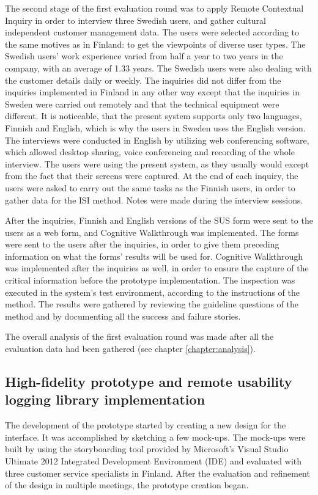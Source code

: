 \documentclass[12pt,a4paper,oneside,pdftex]{report}
\begin{document}
The second stage of the first evaluation round was to apply Remote Contextual Inquiry in order to interview three Swedish users, and gather cultural independent customer management data. The users were selected according to the same motives as in Finland: to get the viewpoints of diverse user types. The Swedish users' work experience varied from half a year to two years in the company, with an average of 1.33 years. The Swedish users were also dealing with the customer details daily or weekly. The inquiries did not differ from the inquiries implemented in Finland in any other way except that the inquiries in Sweden were carried out remotely and that the technical equipment were different. It is noticeable, that the present system supports only two languages, Finnish and English, which is why the users in Sweden uses the English version. The interviews were conducted in English by utilizing web conferencing software, which allowed desktop sharing, voice conferencing and recording of the whole interview. The users were using the present system, as they usually would except from the fact that their screens were captured. At the end of each inquiry, the users were asked to carry out the same tasks as the Finnish users, in order to gather data for the ISI method. Notes were made during the  interview sessions.

After the inquiries, Finnish and English versions of the SUS form were sent to the users as a web form, and Cognitive Walkthrough was implemented. The forms were sent to the users after the inquiries, in order to give them preceding information on what the forms' results will be used for. Cognitive Walkthrough was implemented after the inquiries as well, in order to ensure the capture of the critical information before the prototype implementation. The inspection was executed in the system's test environment, according to the instructions of the method. The results were gathered by reviewing the guideline questions of the method and by documenting all the success and failure stories. 

The overall analysis of the first evaluation round was made after all the evaluation data had been gathered  (see chapter \ref{chapter:analysis}). 

\subsection{High-fidelity prototype and remote usability logging library implementation}

The development of the prototype started by creating a new design for the interface. It was accomplished by sketching a few mock-ups. The mock-ups were built by using the storyboarding tool provided by Microsoft's Visual Studio Ultimate 2012 Integrated Development Environment (IDE) and evaluated with three customer service specialists in Finland. After the evaluation and refinement of the design in multiple meetings, the prototype creation began.
\end{document}
